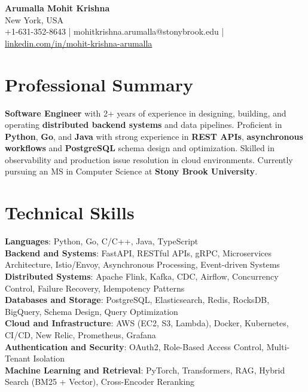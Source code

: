\documentclass[letterpaper,11pt]{article}
\begin{document}
\begin{center}
  {\Large \textbf{Arumalla Mohit Krishna}} \\
  New York, USA \\
  +1-631-352-8643 \enspace | \enspace mohitkrishna.arumalla@stonybrook.edu \enspace | \enspace \href{https://www.linkedin.com/in/mohit-krishna-arumalla}{linkedin.com/in/mohit-krishna-arumalla}
\end{center}

\section{Professional Summary}
  \begin{itemize}[leftmargin=0.15in, label={}]
    \small{\item{
     \textbf{Software Engineer} with 2+ years of experience in designing, building, and operating \textbf{distributed backend systems} and data pipelines. Proficient in \textbf{Python}, \textbf{Go}, and \textbf{Java} with strong experience in \textbf{REST APIs}, \textbf{asynchronous workflows} and \textbf{PostgreSQL} schema design and optimization. Skilled in observability and production issue resolution in cloud environments. Currently pursuing an MS in Computer Science at \textbf{Stony Brook University}.
    }}
  \end{itemize}
\vspace{-16pt}

\section{Technical Skills}
 \begin{itemize}[leftmargin=0.15in, label={}]
    \small{\item{
     \textbf{Languages}: Python, Go, C/C++, Java, TypeScript \\
     \textbf{Backend and Systems}: FastAPI, RESTful APIs, gRPC, Microservices Architecture, Istio/Envoy, Asynchronous Processing, Event-driven Systems \\
     \textbf{Distributed Systems}: Apache Flink, Kafka, CDC, Airflow, Concurrency Control, Failure Recovery, Idempotency Patterns \\
     \textbf{Databases and Storage}: PostgreSQL, Elasticsearch, Redis, RocksDB, BigQuery, Schema Design, Query Optimization \\
     \textbf{Cloud and Infrastructure}: AWS (EC2, S3, Lambda), Docker, Kubernetes, CI/CD, New Relic, Prometheus, Grafana \\
     \textbf{Authentication and Security}: OAuth2, Role-Based Access Control, Multi-Tenant Isolation \\
     \textbf{Machine Learning and Retrieval}: PyTorch, Transformers, RAG, Hybrid Search (BM25 + Vector), Cross-Encoder Reranking 
    }}
 \end{itemize}
\vspace{-16pt}
\end{document}
